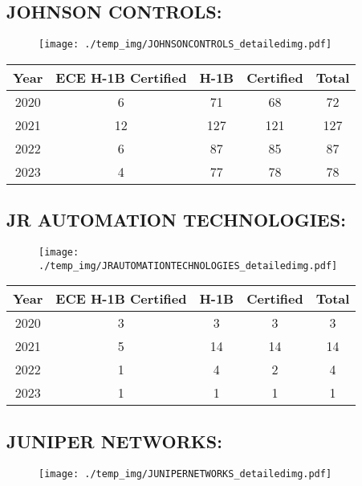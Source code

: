 \documentclass{article}%
\begin{document}
%
\newpage%
\subsection{JOHNSON CONTROLS:}%
\label{subsec:JOHNSONCONTROLS}%
\label{JOHNSONCONTROLSdetailed}%


\begin{figure}[htbp]%
\centering%
\texttt{[image: ./temp\_img/JOHNSONCONTROLS\_detailedimg.pdf]}%
\end{figure}

%
\begin{longtable}{c|c|c|c|c}%
\hline%
Year&ECE H{-}1B Certified&H{-}1B&Certified&Total\\%
\hline%
2020&6&71&68&72\\%
\hline%
2021&12&127&121&127\\%
\hline%
2022&6&87&85&87\\%
\hline%
2023&4&77&78&78\\%
\hline%
\end{longtable}

%
\newpage%
\subsection{JR AUTOMATION TECHNOLOGIES:}%
\label{subsec:JRAUTOMATIONTECHNOLOGIES}%
\label{JRAUTOMATIONTECHNOLOGIESdetailed}%


\begin{figure}[htbp]%
\centering%
\texttt{[image: ./temp\_img/JRAUTOMATIONTECHNOLOGIES\_detailedimg.pdf]}%
\end{figure}

%
\begin{longtable}{c|c|c|c|c}%
\hline%
Year&ECE H{-}1B Certified&H{-}1B&Certified&Total\\%
\hline%
2020&3&3&3&3\\%
\hline%
2021&5&14&14&14\\%
\hline%
2022&1&4&2&4\\%
\hline%
2023&1&1&1&1\\%
\hline%
\end{longtable}

%
\newpage%
\subsection{JUNIPER NETWORKS:}%
\label{subsec:JUNIPERNETWORKS}%
\label{JUNIPERNETWORKSdetailed}%


\begin{figure}[htbp]%
\centering%
\texttt{[image: ./temp\_img/JUNIPERNETWORKS\_detailedimg.pdf]}%
\end{figure}
\end{document}
